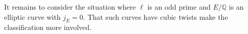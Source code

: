 \documentclass[11pt]{amsart}
\theoremstyle{definition}
\newcommand{\QQ}{\mathbb Q}
\newcommand{\FF}{\mathbb F}
\newcommand{\GL}{\operatorname{GL}}
\begin{document}
It remains to consider the situation where $\ell$ is an odd prime and $E/\QQ$ is an elliptic curve with $j_E=0$.   That such curves have cubic twists make the classification more involved. %
\end{document}
